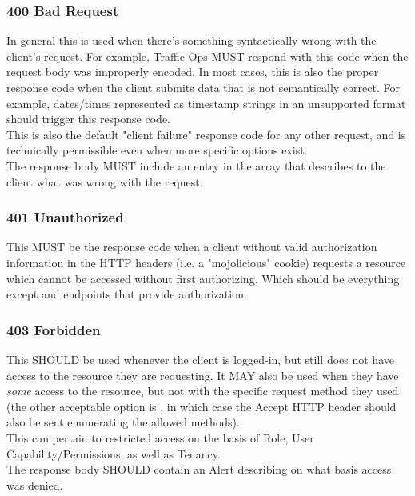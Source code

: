 \subsubsection{400 Bad Request\label{sec:400}}
In general this is used when there's something syntactically wrong with the client's request. For example, Traffic Ops MUST respond with this code
when the request body was improperly encoded. In most cases, this is also the proper response code when the client submits data that is not semantically
correct. For example, dates/times represented as timestamp strings in an unsupported format should trigger this response code.\\
This is also the default "client failure" response code for any other request, and is technically permissible even when more specific options exist.\\
The response body MUST include an entry in the  array that describes to the client what was wrong with the request.

\subsubsection{401 Unauthorized\label{sec:401}}
This MUST be the response code when a client without valid authorization information in the HTTP headers (i.e. a "mojolicious" cookie) requests a resource
which cannot be accessed without first authorizing. Which should be everything except  and endpoints that provide authorization.

\subsubsection{403 Forbidden\label{sec:403}}
This SHOULD be used whenever the client is logged-in, but still does not have access to the resource they are requesting. It MAY also be used when they
have \emph{some} access to the resource, but not with the specific request method they used (the other acceptable option is ,
in which case the Accept HTTP header should also be sent enumerating the allowed methods).\\
This can pertain to restricted access on the basis of Role, User Capability/Permissions, as well as Tenancy.\\
The response body SHOULD contain an Alert describing on what basis access was denied.

